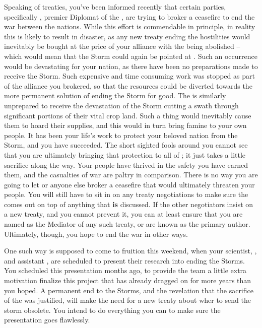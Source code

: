 \documentclass[char]{GL2020}
\begin{document}
Speaking of treaties, you've been informed recently that certain parties, specifically \cHeadDiplomat{\full}, premier Diplomat of the \pShip{}, are trying to broker a ceasefire to end the war between the nations. While this effort is commendable in principle, in reality this is likely to result in disaster, as any new treaty ending the hostilities would inevitably be bought at the price of your alliance with the \pFarm{} being abolished -- which would mean that the Storm could again be pointed at \pTech{}. Such an occurrence would be devastating for your nation, as there have been no preparations made to receive the Storm. Such expensive and time consuming work was stopped as part of the alliance you brokered, so that the resources could be diverted towards the more permanent solution of ending the Storm for good. The \pFarm{} is similarly unprepared to receive the devastation of the Storm cutting a swath through significant portions of their vital crop land. Such a thing would inevitably cause them to hoard their supplies, and this would in turn bring famine to your own people. It has been your life's work to protect your beloved nation from the Storm, and you have succeeded. The short sighted fools around you cannot see that you are ultimately bringing that protection to all of \pEarth{}; it just takes a little sacrifice along the way. Your people have thrived in the safety you have earned them, and the casualties of war are paltry in comparison. There is no way you are going to let \cHeadDiplomat{} or anyone else broker a ceasefire that would ultimately threaten your people. You will still have to sit in on any treaty negotiations to make sure the \pTech{} comes out on top of anything that \textbf{is} discussed. If the other negotiators insist on a new treaty, and you cannot prevent it, you can at least ensure that you are named as the Mediator of any such treaty, or are known as the primary author. Ultimately, though, you hope to end the war in other ways. 

One such way is supposed to come to fruition this weekend, when your scientist, \cHeadScientist{\full}, and \cHeadScientist{\their} assistant \cAssistantScientist{\full}, are scheduled to present their research into ending the Storms. You scheduled this presentation months ago, to provide the team a little extra motivation finalize this project that has already dragged on for more years than you hoped. A permanent end to the Storms, and the revelation that the sacrifice of the \pShip{} was justified, will make the need for a new treaty about wher to send the storm obsolete. You intend to do everything you can to make sure the presentation goes flawlessly. 
\end{document}
